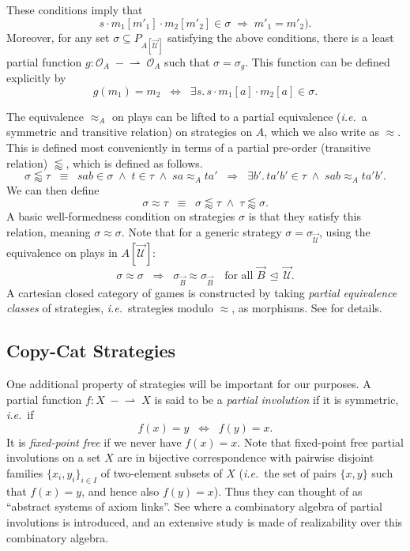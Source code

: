 \documentclass[a4paper,11pt]{article}
\newcommand{\gequiv}{\approx}
\newcommand{\UU}{\mathcal{U}}
\newcommand{\ginc}{\, \trianglelefteq \,}
\newcommand{\Occ}{\mathcal{O}}
\newcommand{\preord}{\lessapprox}
\newcommand{\ie}{\textit{i.e.}\ }
\newcommand{\pfnarrow}{\; - \! \! \! \rightharpoonup \;}
\begin{document}
These conditions imply that
\[ s \cdot m_1[m'_1] \cdot m_2[m'_2] \in \sigma \; \Rightarrow
\; m'_1 = m'_2 ). \]
Moreover, for any set $\sigma \subseteq P_{A[\vec{\UU}]}$ satisfying
the above conditions, there is a
least partial function $g : \Occ_A \pfnarrow \Occ_A$ such that
$\sigma = \sigma_g$. This function can be defined explicitly by
\[ g(m_{1}) = m_2 \;\; \Longleftrightarrow \;\; \exists s. \, s \cdot m_1[a]
 \cdot m_2[a] \in \sigma . \]

The equivalence $\gequiv_A$ on plays can be lifted to a partial equivalence (\ie a symmetric and transitive relation) on strategies on $A$, which we also write as $\gequiv$. This is defined most conveniently in terms of a partial pre-order (transitive relation) $\preord$, which is defined as follows.
\[ \sigma \preord \tau \;\; \equiv \;\; sab \in \sigma \; \wedge \; t \in \tau \; \wedge \; sa \gequiv_A ta' \;\; \Longrightarrow \;\; \exists b' . \, ta'b' \in \tau \; \wedge \; sab \gequiv_A ta'b' . \]
We can then define
\[ \sigma \gequiv \tau \;\; \equiv \;\; \sigma \preord \tau \; \wedge \; \tau \preord \sigma . \]
A basic well-formedness condition on strategies $\sigma$ is that they
satisfy this relation, meaning $\sigma \gequiv \sigma$. Note that for
a generic strategy $\sigma = \sigma_{\vec{\UU}}$, using the
equivalence on plays in $A[\vec{\UU}]$:
\[ \sigma \gequiv \sigma \;\; \Longrightarrow \;\; \sigma_{\vec{B}} \gequiv
  \sigma_{\vec{B}} \quad \mbox{for all $\vec{B}
  \ginc \vec{\UU}$.} \]
A cartesian closed category of games is constructed by taking \emph{partial equivalence classes} of strategies, \ie strategies modulo $\gequiv$, as morphisms. See \cite{AJM00} for details.

\subsection{Copy-Cat Strategies}
One additional property of strategies will be important for
our purposes. A partial function $f : X \pfnarrow X$ is said to be a
\emph{partial involution} if it is symmetric, \ie if
\[ f(x) = y \;\; \Longleftrightarrow \;\; f(y) = x . \]
It is \emph{fixed-point free} if we never have $f(x) = x$.
Note that fixed-point free partial involutions on a set $X$ are in
bijective correspondence with pairwise disjoint families $\{ x_i ,
y_i \}_{i \in I}$ of two-element subsets of $X$ (\ie the set of
pairs $\{ x, y \}$ such that $f(x) = y$, and hence also $f(y) =
x$). Thus they can thought of as ``abstract systems of axiom links''.
See \cite{AL00,AL01} where a combinatory algebra of partial
involutions is introduced, and an extensive study is made of
realizability over this combinatory algebra.
\end{document}
